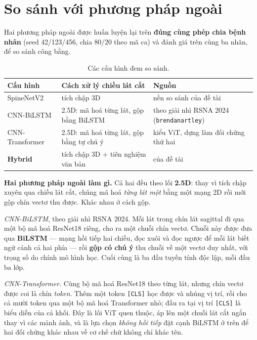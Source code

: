 \documentclass[11pt,a4paper]{article}
\begin{document}
\section{So sánh với phương pháp ngoài}

Hai phương pháp ngoài được huấn luyện lại trên \textbf{đúng cùng phép chia bệnh nhân}
(seed 42/123/456, chia 80/20 theo mã ca) và đánh giá trên cùng ba nhãn, để so sánh công bằng.

\begin{table}[htbp]
\centering\small
\caption{Các cấu hình đem so sánh.}
\label{tab:sota-what}
\begin{tabular}{lll}
\toprule
\textbf{Cấu hình} & \textbf{Cách xử lý chiều lát cắt} & \textbf{Nguồn} \\
\midrule
SpineNetV2      & tích chập 3D & nền so sánh của đề tài \\
CNN-BiLSTM & 2.5D: mã hoá từng lát, gộp bằng BiLSTM & theo giải nhì RSNA 2024 (\texttt{brendanartley}) \\
CNN-Transformer & 2.5D: mã hoá từng lát, gộp bằng tự chú ý & kiểu ViT, dựng làm đối chứng thứ hai \\
\textbf{Hybrid} & tích chập 3D + tiên nghiệm văn bản & của đề tài \\
\bottomrule
\end{tabular}
\end{table}

\textbf{Hai phương pháp ngoài làm gì.} Cả hai đều theo lối \textbf{2.5D}: thay vì tích chập xuyên
qua chiều lát cắt, chúng mã hoá \emph{từng lát một} bằng một mạng 2D rồi mới gộp chín vectơ thu
được. Khác nhau ở cách gộp.

\textit{CNN-BiLSTM}, theo giải nhì RSNA 2024. Mỗi lát trong chín lát sagittal đi qua một bộ mã hoá ResNet18 riêng,
cho ra một chuỗi chín vectơ. Chuỗi này được đưa qua \textbf{BiLSTM} --- mạng hồi tiếp hai chiều,
đọc xuôi và đọc ngược để mỗi lát biết ngữ cảnh cả hai phía --- rồi \textbf{gộp có chú ý} thu chuỗi
về một vectơ duy nhất, với trọng số do chính mô hình học. Cuối cùng là ba đầu tuyến tính độc lập,
mỗi đầu ba lớp.

\textit{CNN-Transformer.} Cùng bộ mã hoá ResNet18 theo từng lát, nhưng chín vectơ được coi là
chín \emph{token}. Thêm một token \texttt{[CLS]} học được và nhúng vị trí, rồi cho cả mười token
qua một bộ mã hoá Transformer nhỏ; đầu ra tại vị trí \texttt{[CLS]} là biểu diễn của cả khối. Đây
là lối ViT quen thuộc, áp lên một chuỗi lát cắt ngắn thay vì các mảnh ảnh, và là lựa chọn
\emph{không hồi tiếp} đặt cạnh BiLSTM ở trên để hai đối chứng khác nhau về cơ chế chứ không chỉ
khác tên.
\end{document}
